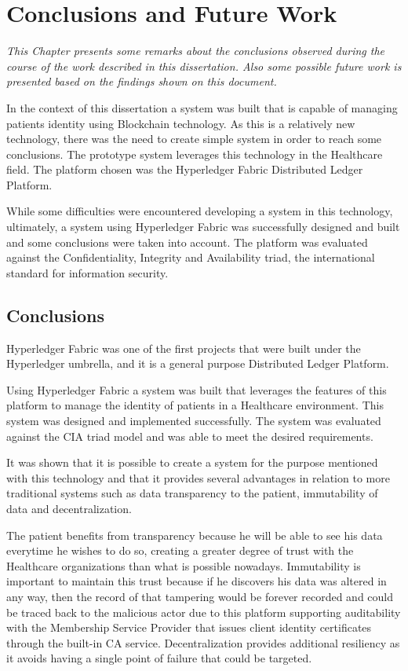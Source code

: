 \chapter{Conclusions and Future Work}
\label{Conclusion}

\emph{This Chapter presents some remarks about the conclusions observed during
the course of the work described in this dissertation. Also some possible
future work is presented based on the findings shown on this document.}

In the context of this dissertation a system was built that is capable of
managing patients identity using Blockchain technology. As this is a relatively
new technology, there was the need to create simple system in order to reach
some conclusions. The prototype system leverages this technology in the
Healthcare field. The platform chosen was the Hyperledger Fabric Distributed
Ledger Platform. 

While some difficulties were encountered developing a system in this
technology, ultimately, a system using Hyperledger Fabric was successfully
designed and built and some conclusions were taken into account. The platform
was evaluated against the Confidentiality, Integrity and Availability triad,
the international standard for information security.

\section{Conclusions}

Hyperledger Fabric was one of the first projects that were built under the
Hyperledger umbrella, and it is a general purpose Distributed Ledger Platform.

Using Hyperledger Fabric a system was built that leverages the features of this
platform to manage the identity of patients in a Healthcare environment. This
system was designed and implemented successfully. The system was evaluated
against the CIA triad model and was able to meet the desired requirements.

It was shown that it is possible to create a system for the purpose mentioned
with this technology and that it provides several advantages in relation to
more traditional systems such as data transparency to the patient, immutability
of data and decentralization.

The patient benefits from transparency because he will be able to see his data
everytime he wishes to do so, creating a greater degree of trust with the
Healthcare organizations than what is possible nowadays. Immutability is
important to maintain this trust because if he discovers his data was altered
in any way, then the record of that tampering would be forever recorded and
could be traced back to the malicious actor due to this platform supporting
auditability with the Membership Service Provider that issues client identity
certificates through the built-in CA service.  Decentralization provides
additional resiliency as it avoids having a single point of failure that could
be targeted.

